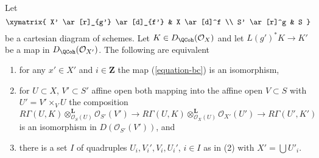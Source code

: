\begin{lemma}
\label{lemma-single-complex-base-change-condition}
Let
$$
\xymatrix{
X' \ar[r]_{g'} \ar[d]_{f'} &
X \ar[d]^f \\
S' \ar[r]^g &
S
}
$$
be a cartesian diagram of schemes. Let $K \in D_\QCoh(\mathcal{O}_X)$
and let $L(g')^*K \to K'$ be a map in $D_\QCoh(\mathcal{O}_{X'})$.
The following are equivalent
\begin{enumerate}
\item for any $x' \in X'$ and $i \in \mathbf{Z}$ the map (\ref{equation-bc})
is an isomorphism,
\item for $U \subset X$, $V' \subset S'$ affine open both mapping
into the affine open $V \subset S$ with $U' = V' \times_V U$
the composition
$$
R\Gamma(U, K) \otimes_{\mathcal{O}_S(U)}^\mathbf{L} \mathcal{O}_{S'}(V')
\to
R\Gamma(U, K) \otimes_{\mathcal{O}_X(U)}^\mathbf{L} \mathcal{O}_{X'}(U')
\to
R\Gamma(U', K')
$$
is an isomorphism in $D(\mathcal{O}_{S'}(V'))$, and
\item there is a set $I$ of quadruples $U_i, V_i', V_i, U_i'$, $i \in I$
as in (2) with $X' = \bigcup U'_i$.
\end{enumerate}
\end{lemma}

